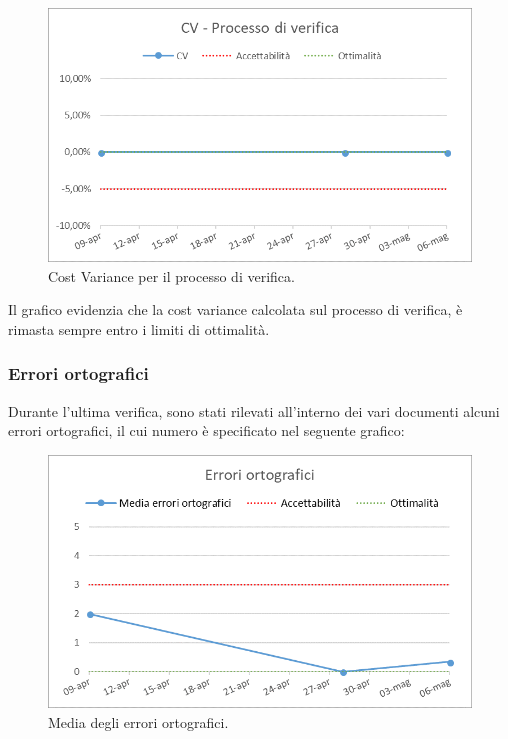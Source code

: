 \begin{figure}[h!]
	\centering
	\includegraphics[scale=0.75]{img/Grafici/CV-V-Documenti.png}
	\caption{Cost Variance per il processo di verifica.}
	\label{fig:CV-VerDocumenti}
\end{figure}

Il grafico evidenzia che la cost variance calcolata sul processo di verifica, è rimasta sempre entro i limiti di ottimalità.


\subsubsection{Errori ortografici}
Durante l'ultima verifica, sono stati rilevati all'interno dei vari documenti alcuni errori ortografici, il cui numero è specificato nel seguente grafico:

\begin{figure}[h!]
	\centering
	\includegraphics[scale=0.6]{img/Grafici/Errori_orto.png}
	\caption{Media degli errori ortografici.}
	\label{fig:Errori_orto}
\end{figure}

